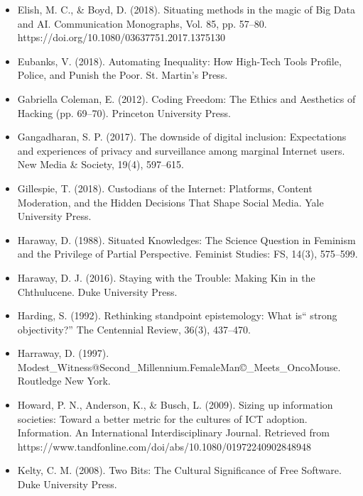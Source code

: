 \documentclass[a4paper,man,natbib]{apa6}
\begin{document}
\begin{itemize}[label={},itemindent=-2em,leftmargin=2em]
   \item Elish, M. C., \& Boyd, D. (2018). Situating methods in the magic of Big Data and AI. Communication Monographs, Vol. 85, pp. 57–80. https://doi.org/10.1080/03637751.2017.1375130

   \item Eubanks, V. (2018). Automating Inequality: How High-Tech Tools Profile, Police, and Punish the Poor. St. Martin’s Press.

   \item Gabriella Coleman, E. (2012). Coding Freedom: The Ethics and Aesthetics of Hacking (pp. 69–70). Princeton University Press.

   \item Gangadharan, S. P. (2017). The downside of digital inclusion: Expectations and experiences of privacy and surveillance among marginal Internet users. New Media \& Society, 19(4), 597–615.

   \item Gillespie, T. (2018). Custodians of the Internet: Platforms, Content Moderation, and the Hidden Decisions That Shape Social Media. Yale University Press.

   \item Haraway, D. (1988). Situated Knowledges: The Science Question in Feminism and the Privilege of Partial Perspective. Feminist Studies: FS, 14(3), 575–599.

   \item Haraway, D. J. (2016). Staying with the Trouble: Making Kin in the Chthulucene. Duke University Press.

   \item Harding, S. (1992). Rethinking standpoint epistemology: What is“ strong objectivity?” The Centennial Review, 36(3), 437–470.

   \item Harraway, D. (1997). Modest\_Witness@Second\_Millennium.FemaleMan\copyright\_Meets\_OncoMouse\texttrademark. Routledge New York.

   \item Howard, P. N., Anderson, K., \& Busch, L. (2009). Sizing up information societies: Toward a better metric for the cultures of ICT adoption. Information. An International Interdisciplinary Journal. Retrieved from https://www.tandfonline.com/doi/abs/10.1080/01972240902848948

   \item Kelty, C. M. (2008). Two Bits: The Cultural Significance of Free Software. Duke University Press.


\end{itemize}
\end{document}

